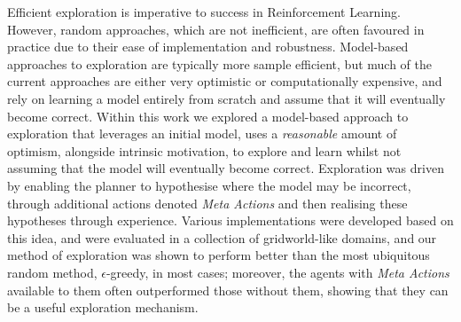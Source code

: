 Efficient exploration is imperative to success in Reinforcement Learning. However, random approaches, which are not inefficient, are often favoured in practice due to their ease of implementation and robustness. Model-based approaches to exploration are typically more sample efficient, but much of the current approaches are either very optimistic or computationally expensive, and rely on learning a model entirely from scratch and assume that it will eventually become correct.
\newline\newline Within this work we explored a model-based approach to exploration that leverages an initial model, uses a \textit{reasonable} amount of optimism, alongside intrinsic motivation, to explore and learn whilst not assuming that the model will eventually become correct. Exploration was driven by enabling the planner to hypothesise where the model may be incorrect, through additional actions denoted \textit{Meta Actions} and then realising these hypotheses through experience.
\newline\newline Various implementations were developed based on this idea, and were evaluated in a collection of gridworld-like domains, and our method of exploration was shown to perform better than the most ubiquitous random method, $\epsilon$-greedy, in most cases; moreover, the agents with \textit{Meta Actions} available to them often outperformed those without them, showing that they can be a useful exploration mechanism.